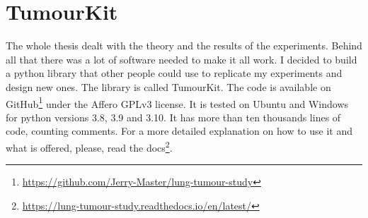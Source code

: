 \chapter{TumourKit}

The whole thesis dealt with the theory and the results of the experiments. Behind all that there was a lot of software needed to make it all work. I decided to build a python library that other people could use to replicate my experiments and design new ones. The library is called TumourKit. The code is available on GitHub\footnote{\url{https://github.com/Jerry-Master/lung-tumour-study}} under the Affero GPLv3 license. It is tested on Ubuntu and Windows for python versions 3.8, 3.9 and 3.10. It has more than ten thousands lines of code, counting comments. For a more detailed explanation on how to use it and what is offered, please, read the docs\footnote{\url{https://lung-tumour-study.readthedocs.io/en/latest/}}.